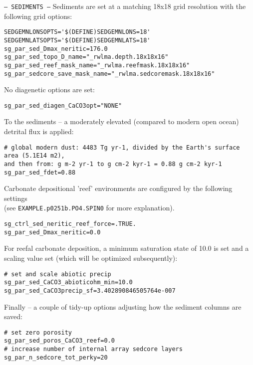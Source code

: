 \documentclass[10pt,twoside]{article}
\begin{document}
\begin{compactitem}
        \item \texttt{--- SEDIMENTS ---}
        Sediments are set at a matching 18x18 grid resolution with the following grid options:
                        \vspace{-5pt}\begin{verbatim}
SEDGEMNLONSOPTS='$(DEFINE)SEDGEMNLONS=18'
SEDGEMNLATSOPTS='$(DEFINE)SEDGEMNLATS=18'
sg_par_sed_Dmax_neritic=176.0
sg_par_sed_topo_D_name="_rwlma.depth.18x18x16"
sg_par_sed_reef_mask_name="_rwlma.reefmask.18x18x16"
sg_par_sedcore_save_mask_name="_rwlma.sedcoremask.18x18x16"
                \end{verbatim}\vspace{-5pt}
        No diagenetic options are set:
                        \vspace{-5pt}\begin{verbatim}
sg_par_sed_diagen_CaCO3opt="NONE"
                \end{verbatim}\vspace{-5pt}
                To the sediments -- a moderately elevated (compared to modern open ocean) detrital flux is applied:
                        \vspace{-5pt}\begin{verbatim}
# global modern dust: 4483 Tg yr-1, divided by the Earth's surface area (5.1E14 m2), 
and then from: g m-2 yr-1 to g cm-2 kyr-1 = 0.88 g cm-2 kyr-1
sg_par_sed_fdet=0.88
                \end{verbatim}\vspace{-5pt}
                Carbonate depositional 'reef' environments are configured by the following settings
                \\ (see \texttt{EXAMPLE.p0251b.PO4.SPIN0} for more explanation).
                        \vspace{-5pt}\begin{verbatim}
sg_ctrl_sed_neritic_reef_force=.TRUE.
sg_par_sed_Dmax_neritic=0.0
                \end{verbatim}\vspace{-5pt}
                For reefal carbonate deposition, a minimum saturation state of 10.0 is set and a scaling value set (which will be optimized subsequently):
                        \vspace{-5pt}\begin{verbatim}
# set and scale abiotic precip
sg_par_sed_CaCO3_abioticohm_min=10.0
sg_par_sed_CaCO3precip_sf=3.402890846505764e-007
                \end{verbatim}\vspace{-5pt}
                Finally -- a couple of tidy-up options adjusting how the sediment columns are saved:
                        \vspace{-5pt}\begin{verbatim}
# set zero porosity
sg_par_sed_poros_CaCO3_reef=0.0
# increase number of internal array sedcore layers
sg_par_n_sedcore_tot_perky=20
                \end{verbatim}\vspace{-5pt}
                

\end{compactitem}
\end{document}
